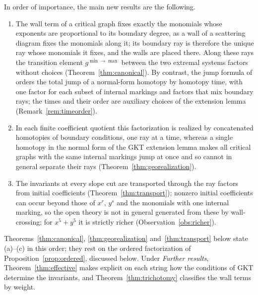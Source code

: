 \documentclass[11pt]{amsart}
\theoremstyle{definition}
\theoremstyle{remark}
\begin{document}
In order of importance, the main new results are the following.
\begin{enumerate}
\item[(a)] The wall term of a critical graph fixes exactly the monomials whose
exponents are proportional to its boundary degree, as a wall of a scattering
diagram fixes the monomials along it; its boundary ray is therefore the unique
ray whose monomials it fixes, and the walls are placed there.  Along these
rays the transition element $g^{\min\to\max}$ between the two extremal systems
factors without choices (Theorem~\ref{thm:canonical}).  By contrast, the jump
formula of \cite[proof of Thm.~5.9]{GKT} orders the total jump of a
normal-form homotopy by homotopy time, with one factor for each subset of
internal markings and factors that mix boundary rays; the times and their
order are auxiliary choices of the extension lemma
(Remark~\ref{rem:timeorder}).
\item[(b)] In each finite coefficient quotient this factorization is realized
by concatenated homotopies of boundary conditions, one ray at a time, whereas
a single homotopy in the normal form of the GKT extension lemma makes all
critical graphs with the same internal markings jump at once and so cannot in
general separate their rays (Theorem~\ref{thm:georealization}).
\item[(c)] The invariants at every slope cut are transported through the ray
factors from initial coefficients (Theorem~\ref{thm:transport}); nonzero
initial coefficients can occur beyond those of $x^r$, $y^s$ and the monomials
with one internal marking, so the open theory is not in general generated from
these by wall-crossing; for $x^5+y^5$ it is strictly richer
(Observation~\ref{obs:richer}).
\end{enumerate}
Theorems~\ref{thm:canonical}, \ref{thm:georealization}
and~\ref{thm:transport} below state (a)--(c) in this order; they rest on the
ordered factorization of Proposition~\ref{prop:ordered}, discussed below.
Under \emph{Further results},
Theorem~\ref{thm:effective} makes explicit on each string how the conditions
of GKT determine the invariants, and Theorem~\ref{thm:trichotomy} classifies
the wall terms by weight.
\end{document}
